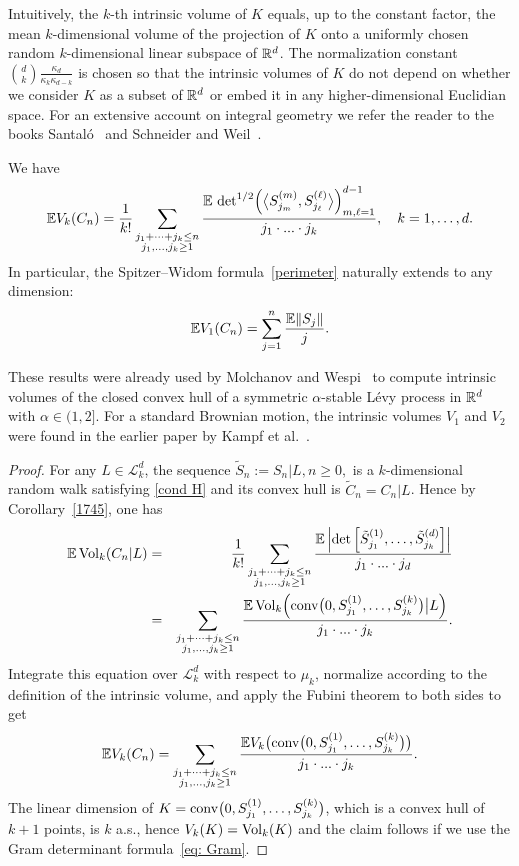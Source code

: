 \documentclass[12pt, reqno]{amsart}
\begin{document}
Intuitively, the $k$-th intrinsic volume of $K$ equals, up to the constant factor, the mean $k$-dimensional volume of the projection of $K$ onto a uniformly chosen random $k$-dimensional linear subspace of $\mathbb{R}^d$. The normalization constant $\binom{d}{k}\frac{\kappa_d}{\kappa_{k}\kappa_{d-k}}$ is chosen so that the intrinsic volumes of $K$ do not depend on whether we consider $K$ as a subset of $\mathbb{R}^d$ or embed it in any higher-dimensional Euclidian space. For an extensive account on integral geometry we refer the reader to the books Santal\'o~\cite{lS76} and Schneider and Weil~\cite{schneider_weil_book}.

\begin{cor}
We have
$$
\mathbb{E} V_k (C_n) = \frac{1}{k!}\sum_{\substack{j_1+\dots+j_k\leq n\\ j_1,\dots, j_k\geq1}}\frac{\mathbb{E}\, \det^{1/2}\Bigl(\bigl\langle S^{(m)}_{j_m},S^{(\ell)}_{j_\ell} \bigr\rangle\Bigr)_{m, \ell=1}^{d-1} } {j_1\cdot ... \cdot j_k},\quad k=1,\dots,d.
$$
In particular, the Spitzer--Widom formula~\eqref{perimeter} naturally extends to any dimension:
$$
\mathbb{E} V_1 (C_n) = \sum_{j=1}^n \frac{\mathbb{E}\|S_j\|}{j}.
$$
\end{cor}
These results were already used by Molchanov and Wespi~\cite[Theorem 2.3]{MolchanovWespi} to compute intrinsic volumes of the closed convex hull of a symmetric $\alpha$-stable L{\'e}vy process in $\mathbb{R}^d$ with $\alpha \in (1,2]$. For a standard Brownian motion, the intrinsic volumes $V_1$ and $V_2$ were found in the earlier paper by Kampf et al.~\cite{kampf_etal}.

\begin{proof}
For any $L \in \mathcal L_k^d$, the sequence $\tilde S_n:= S_n|L, n \ge 0,$ is a $k$-dimensional random walk satisfying \eqref{cond H} and its convex hull is $\tilde C_ n = C_n|L$. Hence by Corollary~\ref{1745}, one has
\begin{eqnarray*}
\mathbb{E}\mathop{\mathrm{Vol}}\nolimits_k (C_n|L)&=&\frac{1}{ k!}\sum_{\substack{j_1+\dots+j_{k}\leq n\\ j_1,\dots, j_{k}\geq1}}\frac{\mathbb{E}\left |\det\left[\tilde{S}^{(1)}_{j_1}, \dots, \tilde{S}^{(d)}_{j_{k}}\right] \right|}{j_1\cdot ... \cdot j_{d}} \\
&=&\sum_{\substack{j_1+\dots+j_k\leq n\\ j_1,\dots, j_k\geq1}}\frac{\mathbb{E}\mathop{\mathrm{Vol}}\nolimits_k \Bigl( \mathop{\mathrm{conv}}\nolimits\bigl(0,S^{(1)}_{j_1}, \dots, S^{(k)}_{j_k}\bigr) \bigl | \bigr. L \Bigr)}{j_1\cdot ... \cdot j_k}.
\end{eqnarray*}
Integrate this equation over $\mathcal L_k^d$ with respect to $\mu_k$, normalize according to the definition of the intrinsic volume, and apply the Fubini theorem to both sides to get 
$$
\mathbb{E} V_k (C_n)= \sum_{\substack{j_1+\dots+j_k\leq n\\ j_1,\dots, j_k\geq1}}\frac{\mathbb{E} V_k \bigl( \mathop{\mathrm{conv}}\nolimits\bigl(0,S^{(1)}_{j_1}, \dots, S^{(k)}_{j_k}\bigr)  \bigr)}{j_1\cdot ... \cdot j_k}.
$$
The linear dimension of $K= \mathop{\mathrm{conv}}\nolimits\bigl(0,S^{(1)}_{j_1}, \dots, S^{(k)}_{j_k}\bigr)$, which is a convex hull of $k+1$ points, is $k$ a.s., hence $V_k(K)=\mathop{\mathrm{Vol}}\nolimits_k(K)$ and the claim follows if we use the Gram determinant formula~\eqref{eq: Gram}.
\end{proof}
\end{document}
